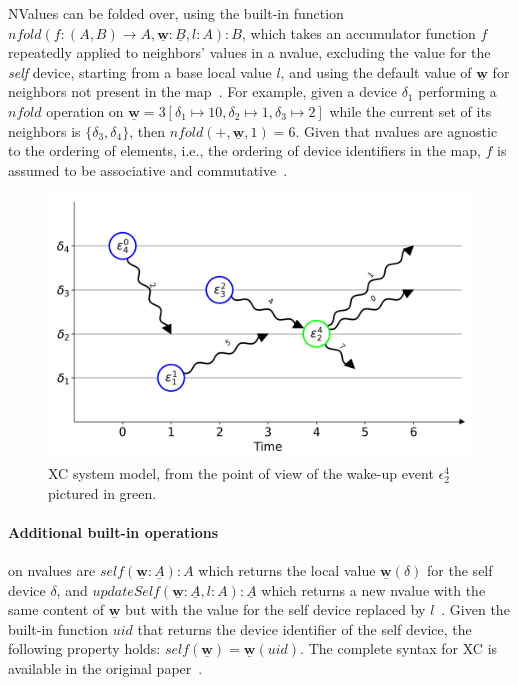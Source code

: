 NValues can be folded over, using the built-in function $nfold(f : (A, B) \rightarrow A, \underline{\mathbf{w}} : \underline{B}, l : A) : B$, which takes an accumulator function $f$ repeatedly applied to neighbors' values in a nvalue, excluding the value for the \textit{self} device, starting from a base local value $l$, and using the default value of $\underline{\mathbf{w}}$ for neighbors not present in the map~\cite{xc}.
%
For example, given a device $\delta_1$ performing a $nfold$ operation on $\underline{\mathbf{w}} = 3[\delta_1 \mapsto 10, \delta_2 \mapsto 1, \delta_3 \mapsto 2]$ while the current set of its neighbors is $\{\delta_3, \delta_4\}$, then $nfold(+, \underline{\mathbf{w}}, 1) = 6$.
%
Given that nvalues are agnostic to the ordering of elements, i.e., the ordering of device identifiers in the map, $f$ is assumed to be associative and commutative~\cite{xc}.

\begin{figure}
    \centering
    \includegraphics[width=.8\linewidth]{figures/nvalues-example.png}
    \caption{XC system model, from the point of view of the wake-up event $\epsilon_2^4$ pictured in green.}
    \label{fig:xc-nvalues-exampke}
\end{figure}

\paragraph{Additional built-in operations} on nvalues are $self(\underline{\mathbf{w}} : \underline{A}) : A$ which returns the local value $\underline{\mathbf{w}}(\delta)$ for the self device $\delta$, and $updateSelf(\underline{\mathbf{w}} : \underline{A}, l : A) : \underline{A}$ which returns a new nvalue with the same content of $\underline{\mathbf{w}}$ but with the value for the self device replaced by $l$~\cite{xc}.
%
Given the built-in function $uid$ that returns the device identifier of the self device, the following property holds: $self(\underline{\mathbf{w}}) = \underline{\mathbf{w}}(uid)$.
%
The complete syntax for \ac{XC} is available in the original paper~\cite[p. 4]{xc}.

